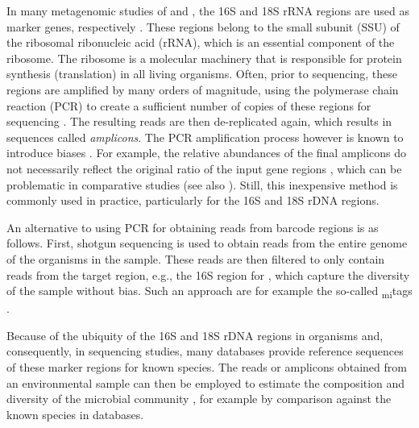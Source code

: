 
In many metagenomic studies of  and ,
the 16S \cite{Weisburg1991} and 18S \cite{Meyer2010} rRNA regions are used as marker genes,
respectively \cite{Woese1977,Woese1990}.
These regions belong to the small subunit (SSU) of the ribosomal ribonucleic acid (rRNA),
which is an essential component of the ribosome.
The ribosome is a molecular machinery that is responsible for protein synthesis (translation) in all living organisms.
Often, prior to sequencing, these regions are amplified by many orders of magnitude,
using the polymerase chain reaction (PCR)
to create a sufficient number of copies of these regions for sequencing \cite{Bartlett2003}.
The resulting reads are then de-replicated again, which results in sequences called \emph{amplicons}.
The PCR amplification process however is known to introduce biases \cite{Logares2014,Brown2017}.
For example, the relative abundances of the final amplicons
do not necessarily reflect the original ratio of the input gene regions \cite{Kanagawa2003},
which can be problematic in comparative studies
(see also ).
Still, this inexpensive method is commonly used in practice, particularly for the 16S and 18S rDNA regions.

An alternative to using PCR for obtaining reads from barcode regions is as follows.
First, shotgun sequencing is used to obtain reads from the entire genome of the organisms in the sample.
These reads are then filtered to only contain reads from the target region, e.g., the 16S region for ,
which capture the diversity of the sample without bias.
Such an approach are for example the so-called \textsubscript{mi}tags \cite{Logares2014}.

Because of the ubiquity of the 16S and 18S rDNA regions in organisms and, consequently, in sequencing studies,
many databases provide reference sequences of these marker regions for known species.
The reads or amplicons obtained from an environmental sample can then be employed
to estimate the composition and diversity of the microbial community \cite{Hugerth2017},
for example by comparison against the known species in databases.

